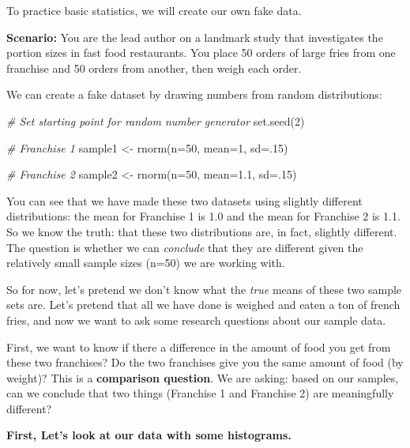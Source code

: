 \documentclass[
]{book}
\newenvironment{Shaded}{\begin{snugshade}}{\end{snugshade}}
\newcommand{\AttributeTok}[1]{\textcolor[rgb]{0.77,0.63,0.00}{#1}}
\newcommand{\CommentTok}[1]{\textcolor[rgb]{0.56,0.35,0.01}{\textit{#1}}}
\newcommand{\DecValTok}[1]{\textcolor[rgb]{0.00,0.00,0.81}{#1}}
\newcommand{\FloatTok}[1]{\textcolor[rgb]{0.00,0.00,0.81}{#1}}
\newcommand{\FunctionTok}[1]{\textcolor[rgb]{0.00,0.00,0.00}{#1}}
\newcommand{\NormalTok}[1]{#1}
\newcommand{\OtherTok}[1]{\textcolor[rgb]{0.56,0.35,0.01}{#1}}
\begin{document}
To practice basic statistics, we will create our own fake data.

\textbf{Scenario:} You are the lead author on a landmark study that investigates the portion sizes in fast food restaurants. You place 50 orders of large fries from one franchise and 50 orders from another, then weigh each order.

We can create a fake dataset by drawing numbers from random distributions:

\begin{Shaded}
\begin{Highlighting}[]
\CommentTok{\# Set starting point for random number generator}
\FunctionTok{set.seed}\NormalTok{(}\DecValTok{2}\NormalTok{)}

\CommentTok{\# Franchise 1}
\NormalTok{sample1 }\OtherTok{\textless{}{-}} \FunctionTok{rnorm}\NormalTok{(}\AttributeTok{n=}\DecValTok{50}\NormalTok{, }\AttributeTok{mean=}\DecValTok{1}\NormalTok{, }\AttributeTok{sd=}\NormalTok{.}\DecValTok{15}\NormalTok{)}

\CommentTok{\# Franchise 2}
\NormalTok{sample2 }\OtherTok{\textless{}{-}} \FunctionTok{rnorm}\NormalTok{(}\AttributeTok{n=}\DecValTok{50}\NormalTok{, }\AttributeTok{mean=}\FloatTok{1.1}\NormalTok{, }\AttributeTok{sd=}\NormalTok{.}\DecValTok{15}\NormalTok{)}
\end{Highlighting}
\end{Shaded}

You can see that we have made these two datasets using slightly different distributions: the mean for Franchise 1 is 1.0 and the mean for Franchise 2 is 1.1. So we know the truth: that these two distributions are, in fact, slightly different. The question is whether we can \emph{conclude} that they are different given the relatively small sample sizes (n=50) we are working with.

So for now, let's pretend we don't know what the \emph{true} means of these two sample sets are. Let's pretend that all we have done is weighed and eaten a ton of french fries, and now we want to ask some research questions about our sample data.

First, we want to know if there a difference in the amount of food you get from these two franchises? Do the two franchises give you the same amount of food (by weight)? This is a \textbf{comparison question}. We are asking: based on our samples, can we conclude that two things (Franchise 1 and Franchise 2) are meaningfully different?

\textbf{First, Let's look at our data with some histograms.}
\end{document}
